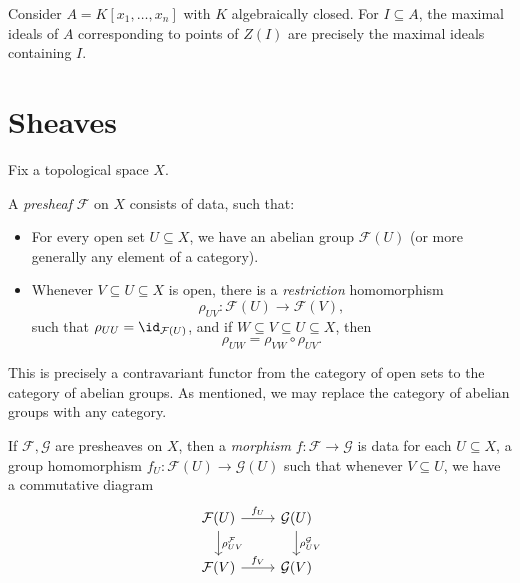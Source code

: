 \documentclass[12pt]{article}
\begin{document}
\begin{exbox}
	Consider $A = K[x_1, \ldots, x_n]$ with $K$ algebraically closed. For $I \subseteq A$, the maximal ideals of $A$ corresponding to points of $Z(I)$ are precisely the maximal ideals containing $I$.
\end{exbox}

\newpage

\section{Sheaves}%
\label{sec:sheaf}

Fix a topological space $X$.

\begin{definition}
	A \emph{presheaf} $\mathcal{F}$ on $X$ consists of data, such that:
	\begin{itemize}
			\item For every open set $U \subseteq X$, we have an abelian group $\mathcal{F}(U)$ (or more generally any element of a category).
			\item Whenever $V \subseteq U \subseteq X$ is open, there is a \emph{restriction} homomorphism
				\[
				\rho_{UV} : \mathcal{F}(U) \to \mathcal{F}(V),
				\]
				such that $\rho_{UU} = \id_{\mathcal{F}(U)}$, and if $W \subseteq V \subseteq U \subseteq X$, then
				\[
				\rho_{UW} = \rho_{VW} \circ \rho_{UV}.
				\]
	\end{itemize}	
\end{definition}

\begin{remark}
	This is precisely a contravariant functor from the category of open sets to the category of abelian groups. As mentioned, we may replace the category of abelian groups with any category.
\end{remark}

\begin{definition}
	If $\mathcal{F}, \mathcal{G}$ are presheaves on $X$, then a \emph{morphism} $f : \mathcal{F} \to \mathcal{G}$ is data for each $U \subseteq X$, a group homomorphism $f_U : \mathcal{F}(U) \to \mathcal{G}(U)$ such that whenever $V \subseteq U$, we have a commutative diagram
	\[
	\begin{tikzcd}
		\mathcal{F}(U) \arrow[r, "f_U"] \arrow[d, "\rho_{UV}^{\mathcal{F}}"] & \mathcal{G}(U) \arrow[d, "\rho_{UV}^{\mathcal{G}}"] \\
		\mathcal{F}(V) \arrow[r, "f_V"] & \mathcal{G}(V)
	\end{tikzcd}
	\]
\end{definition}
\end{document}
